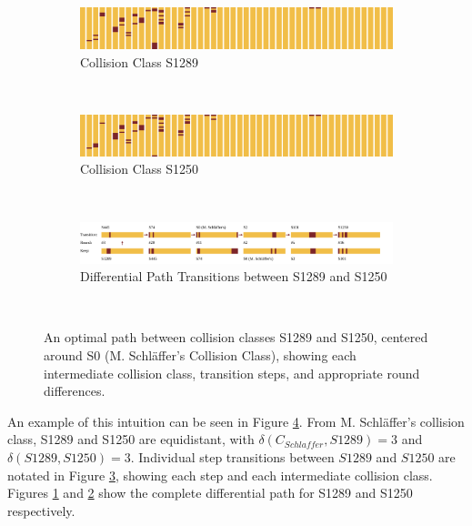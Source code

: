 \documentclass[conference]{IEEEtran}
\begin{document}
\begin{figure}
\begin{center}
  \begin{subfigure}{\textwidth}
    \includegraphics[width=\textwidth]{Figs/differential-1289.png}
    \caption{Collision Class S1289}
    \label{Fig:1289}
  \end{subfigure}\\
  \begin{subfigure}{\textwidth}
    \includegraphics[width=\textwidth]{Figs/differential-1250.png}
    \caption{Collision Class S1250}
    \label{Fig:1250}
  \end{subfigure}\\
  \begin{subfigure}{\textwidth}
    \includegraphics[width=\textwidth]{Figs/transitions.pdf}
    \caption{Differential Path Transitions between S1289 and S1250}
    \label{Fig:Transitions}
  \end{subfigure}\\
  \caption{An optimal path between collision classes S1289 and S1250,
  centered around S0 (M. Schl{\"a}ffer's Collision Class), showing each
  intermediate collision class, transition steps, and appropriate
  round differences.}
  \label{Fig:Transition}
\end{center}
\end{figure}

An example of this intuition can be seen in Figure \ref{Fig:Transition}.
From M. Schl{\"a}ffer's collision class, S1289 and S1250 are equidistant, with
$\delta(C_{Schlaffer}, S1289) = 3$ and $\delta(S1289, S1250) = 3$.
Individual step transitions between $S1289$ and $S1250$ are notated in
Figure \ref{Fig:Transitions}, showing each step and each intermediate collision
class. Figures \ref{Fig:1289} and \ref{Fig:1250} show the complete differential
path for S1289 and S1250 respectively.
\end{document}

